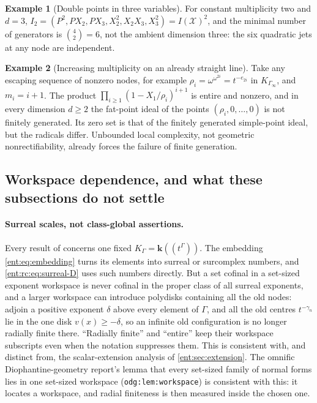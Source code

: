 \documentclass[11pt]{article}
\theoremstyle{plain}
\theoremstyle{plain}
\theoremstyle{plain}
\theoremstyle{definition}
\theoremstyle{definition}
\theoremstyle{definition}
\newtheorem{example}[example]{Example}
\theoremstyle{definition}
\theoremstyle{remark}
\newcommand{\K}{K_\Gamma}\newcommand{\KD}{K_\Delta}
\newcommand{\kk}{\mathbf k}\newcommand{\PP}{\mathbb P}
\begin{document}
\begin{example}[Double points in three variables]\label{ent:rc:ex:double}
For constant multiplicity two and $d=3$,
$I_2=(P^2,PX_2,PX_3,X_2^2,X_2X_3,X_3^2)=I(\mathcal X)^2$, and the minimal
number of generators is $\binom42=6$, not the ambient dimension three: the six
quadratic jets at any node are independent.
\end{example}

\begin{example}[Increasing multiplicity on an already straight line]
\label{ent:rc:ex:increasing}
Take any escaping sequence of nonzero nodes, for example
$\rho_i=\omega^{\omega^{2i}}=t^{-e_{2i}}$ in $K_{\Gamma_\infty}$, and
$m_i=i+1$. The product $\prod_{i\ge1}(1-X_1/\rho_i)^{i+1}$ is entire and
nonzero, and in every dimension $d\ge2$ the fat-point ideal of the points
$(\rho_i,0,\ldots,0)$ is not finitely generated. Its zero set is that of the
finitely generated simple-point ideal, but the radicals differ. Unbounded local
complexity, not geometric nonrectifiability, already forces the failure of
finite generation.
\end{example}

\subsection{Workspace dependence, and what these subsections do not settle}
\label{ent:rc:subsec:limits}

\paragraph{Surreal scales, not class-global assertions.}
Every result of 
concerns one fixed $\K=\kk((t^\Gamma))$. The embedding \eqref{ent:eq:embedding}
turns its elements into surreal or surcomplex numbers, and
\eqref{ent:rc:eq:surreal-D} uses such numbers directly. But a set cofinal in a
set-sized exponent workspace is never cofinal in the proper class of all
surreal exponents, and a larger workspace can introduce polydisks containing
all the old nodes: adjoin a positive exponent $\delta$ above every element of
$\Gamma$, and all the old centres $t^{-\gamma_n}$ lie in the one disk
$v(x)\ge-\delta$, so an infinite old configuration is no longer radially
finite there. ``Radially finite'' and ``entire'' keep their workspace
subscripts even when the notation suppresses them. This is consistent with,
and distinct from, the scalar-extension analysis of \cref{ent:sec:extension}.
The omnific Diophantine-geometry report's lemma that every set-sized family of
normal forms lies in one set-sized workspace (\texttt{odg:lem:workspace}) is
consistent with this: it locates a workspace, and radial finiteness is then
measured inside the chosen one.
\end{document}
